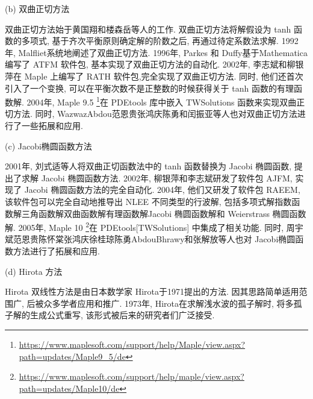 (b) 双曲正切方法 

双曲正切方法始于黄国翔和楼森岳等人\cite{huang1989exact}的工作. 双曲正切方法将解假设为 tanh 函数的多项式, 基于齐次平衡原则确定解的阶数之后, 再通过待定系数法求解. 1992年, Malfliet\cite{malfliet1992solitary}系统地阐述了双曲正切方法. 1996年, Parkes 和 Duffy\cite{parkes1996automated}基于Mathematica 编写了 ATFM 软件包, 基本实现了双曲正切方法的自动化. 2002年, 李志斌和柳银萍\cite{liu2001master,li2002rath}在 Maple 上编写了 RATH 软件包,完全实现了双曲正切方法. 同时, 他们还首次引入了一个变换, 可以在平衡次数不是正整数的时候获得关于 tanh 函数的有理函数解. 2004年, Maple 9.5 \footnote{\url{https://www.maplesoft.com/support/help/Maple/view.aspx?path=updates/Maple9_5/de}}在 PDEtools 库中嵌入 TWSolutions 函数来实现双曲正切方法. 同时, Wazwaz\cite{wazwaz2004tanh}\D Abdou\cite{abdou2007extended}\D 范恩贵\cite{fan2000extended}\D 张鸿庆\cite{lu2003further}\D 陈勇\cite{zheng2003generalized}和闰振亚\cite{yan2001new}等人也对双曲正切方法进行了一些拓展和应用. 

(c) Jacobi椭圆函数方法

2001年, 刘式适等人\cite{liu2001jacobi}将双曲正切函数法中的 tanh 函数替换为 Jacobi 椭圆函数, 提出了求解 Jacobi 椭圆函数方法. 2002年, 柳银萍和李志斌\cite{yin2002automated}研发了软件包 AJFM, 实现了 Jacobi 椭圆函数方法的完全自动化. 2004年, 他们\cite{li2004raeem}又研发了软件包 RAEEM, 该软件包可以完全自动地推导出 NLEE 不同类型的行波解, 包括多项式解\D 指数函数解\D 三角函数解\D 双曲函数解\D 有理函数解\D Jacobi 椭圆函数解和 Weierstrass 椭圆函数解. 2005年, Maple 10 \footnote{\url{https://www.maplesoft.com/support/help/maple/view.aspx?path=updates/Maple10/de}}在 PDEtools[TWSolutions] 中集成了相关功能. 同时, 周宇斌\cite{zhou2003periodic}\D 范恩贵\cite{fan2002applications}\D 陈怀棠\cite{chen2003improved}\D 张鸿庆\cite{yu2005extended}\D 徐桂琼\cite{gui2005applications}\D 陈勇\cite{chen2005extended}\D Abdou\cite{abdou2007construction}\D Bhrawy\cite{bhrawy2013cnoidal}和张解放\cite{jia2004general,chao2005symbolic}等人也对 Jacobi椭圆函数方法进行了拓展和应用. 

(d) Hirota 方法

Hirota 双线性方法是由日本数学家 Hirota\cite{hirota1971exact}于1971提出的方法. 因其思路简单\D 适用范围广, 后被众多学者应用和推广. 1973年, Hirota\cite{hirota1973exact}在求解浅水波的孤子解时, 将多孤子解的生成公式重写, 该形式被后来的研究者们广泛接受. 


